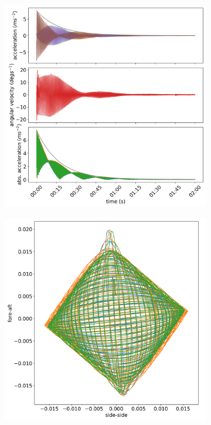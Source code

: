 \documentclass{article}
\begin{document}
\begin{figure}

    \centering
    \begin{subfigure}[b]{0.45\textwidth}
        \centering
        \includegraphics[width=\textwidth]{../results/experiment/medium_mass_acceleration.png}
        \caption{}
        \label{fig:medium-mass:acc}
    \end{subfigure}
    \begin{subfigure}[b]{0.45\textwidth}
        \centering
        \includegraphics[width=\textwidth]{../results/experiment/medium_mass_orbit.png}

\end{subfigure}
\end{figure}
\end{document}
